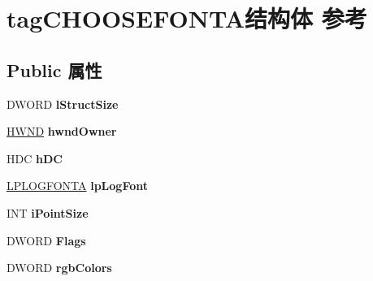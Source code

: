 \hypertarget{structtag_c_h_o_o_s_e_f_o_n_t_a}{}\section{tag\+C\+H\+O\+O\+S\+E\+F\+O\+N\+T\+A结构体 参考}
\label{structtag_c_h_o_o_s_e_f_o_n_t_a}
\subsection*{Public 属性}
\begin{DoxyCompactItemize}
\item 
\mbox{\label{structtag_c_h_o_o_s_e_f_o_n_t_a_a776578b719e0cadacbea4022762d7b53}} 
D\+W\+O\+RD {\bfseries l\+Struct\+Size}
\item 
\mbox{\label{structtag_c_h_o_o_s_e_f_o_n_t_a_ab401b345246f61778fb3d2cf45c32100}} 
\hyperlink{interfacevoid}{H\+W\+ND} {\bfseries hwnd\+Owner}
\item 
\mbox{\label{structtag_c_h_o_o_s_e_f_o_n_t_a_a17cfde34fac8380f2919db2b499acbcb}} 
H\+DC {\bfseries h\+DC}
\item 
\mbox{\label{structtag_c_h_o_o_s_e_f_o_n_t_a_a6e0951bc1b10d48f490f00b5f0e2c38b}} 
\hyperlink{structtag_l_o_g_f_o_n_t_a}{L\+P\+L\+O\+G\+F\+O\+N\+TA} {\bfseries lp\+Log\+Font}
\item 
\mbox{\label{structtag_c_h_o_o_s_e_f_o_n_t_a_a5dd08e3e230c48c4847e4b3bf861e44f}} 
I\+NT {\bfseries i\+Point\+Size}
\item 
\mbox{\label{structtag_c_h_o_o_s_e_f_o_n_t_a_adaab814aa66fd6f956c9046a98c40d0f}} 
D\+W\+O\+RD {\bfseries Flags}
\item 
\mbox{\label{structtag_c_h_o_o_s_e_f_o_n_t_a_af9110a96f80b173f12373451d6435424}} 
D\+W\+O\+RD {\bfseries rgb\+Colors}
\item 
\mbox{\label{structtag_c_h_o_o_s_e_f_o_n_t_a_ac459893c86ad66d5f2693417ffbdb049}} 

\end{DoxyCompactItemize}
